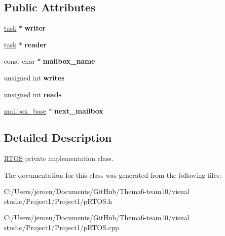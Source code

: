 \subsection*{Public Attributes}
\begin{DoxyCompactItemize}
\item 
\hyperlink{class_r_t_o_s_1_1task}{task} $\ast$ {\bfseries writer}\hypertarget{class_r_t_o_s_1_1mailbox__base_a826bfc52d21d4b17c339e480b633a8dd}{}\label{class_r_t_o_s_1_1mailbox__base_a826bfc52d21d4b17c339e480b633a8dd}

\item 
\hyperlink{class_r_t_o_s_1_1task}{task} $\ast$ {\bfseries reader}\hypertarget{class_r_t_o_s_1_1mailbox__base_a5d5e58ab7774ea08e68dd5694bdee6cc}{}\label{class_r_t_o_s_1_1mailbox__base_a5d5e58ab7774ea08e68dd5694bdee6cc}

\item 
const char $\ast$ {\bfseries mailbox\+\_\+name}\hypertarget{class_r_t_o_s_1_1mailbox__base_a133b02c5f2c1dcff4c9346f9455ef351}{}\label{class_r_t_o_s_1_1mailbox__base_a133b02c5f2c1dcff4c9346f9455ef351}

\item 
unsigned int {\bfseries writes}\hypertarget{class_r_t_o_s_1_1mailbox__base_ad516d6ec92cf782c12a0e4b09d232b89}{}\label{class_r_t_o_s_1_1mailbox__base_ad516d6ec92cf782c12a0e4b09d232b89}

\item 
unsigned int {\bfseries reads}\hypertarget{class_r_t_o_s_1_1mailbox__base_a9f8bd0ca7d31c8ceec1901d08613d533}{}\label{class_r_t_o_s_1_1mailbox__base_a9f8bd0ca7d31c8ceec1901d08613d533}

\item 
\hyperlink{class_r_t_o_s_1_1mailbox__base}{mailbox\+\_\+base} $\ast$ {\bfseries next\+\_\+mailbox}\hypertarget{class_r_t_o_s_1_1mailbox__base_a7dc6ac147e3abbd3a3d77ab97812bada}{}\label{class_r_t_o_s_1_1mailbox__base_a7dc6ac147e3abbd3a3d77ab97812bada}

\end{DoxyCompactItemize}


\subsection{Detailed Description}
\hyperlink{class_r_t_o_s}{R\+T\+OS} private implementation class. 

The documentation for this class was generated from the following files\+:\begin{DoxyCompactItemize}
\item 
C\+:/\+Users/jeroen/\+Documents/\+Git\+Hub/\+Thema6-\/team10/visual studio/\+Project1/\+Project1/p\+R\+T\+O\+S.\+h\item 
C\+:/\+Users/jeroen/\+Documents/\+Git\+Hub/\+Thema6-\/team10/visual studio/\+Project1/\+Project1/p\+R\+T\+O\+S.\+cpp\end{DoxyCompactItemize}
